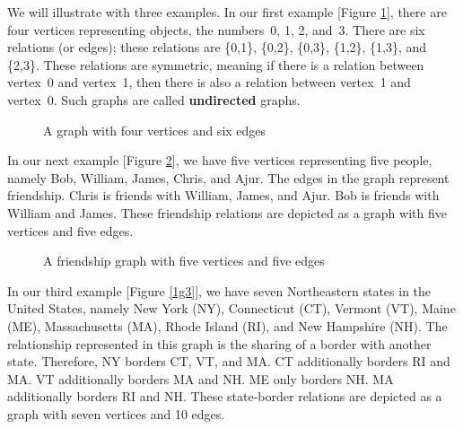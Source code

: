 We will illustrate with three examples. In our first example [Figure \ref{1g1}], there are four vertices representing objects, the numbers~0, 1, 2, and~3. There are six relations (or edges); these relations are \{0,1\}, \{0,2\}, \{0,3\}, \{1,2\}, \{1,3\}, and \{2,3\}. These relations are symmetric, meaning if there is a relation between vertex~0 and vertex~1, then there is also a relation between vertex~1 and vertex~0. Such graphs are called \textbf{undirected} graphs.
\begin{figure}
\begin{center}
\caption{A graph with four vertices and six edges}\label{1g1}
\end{center}
\end{figure}
\begin{newpage}
\end{newpage}

In our next example [Figure \ref{1g2}], we have five vertices representing five people, namely Bob, William, James, Chris, and Ajur. The edges in the graph represent friendship. Chris is friends with William, James, and Ajur. Bob is friends with William and James. These friendship relations are depicted as a graph with five vertices and five edges.
\begin{figure}
\begin{center}
\caption{A friendship graph with five vertices and five edges}\label{1g2}
\end{center}
\end{figure}


\begin{newpage}
\end{newpage}
In our third example [Figure \ref{1g3}], we have seven Northeastern states in the United States, namely New York (NY), Connecticut (CT), Vermont (VT), Maine (ME), Massachusetts (MA), Rhode Island (RI), and New Hampshire (NH). The relationship represented in this graph is the sharing of a border with another state. Therefore, NY borders CT, VT, and MA. CT additionally borders RI and MA. VT additionally borders MA and NH. ME only borders NH. MA additionally borders RI and NH. These state-border relations are depicted as a graph with seven vertices and 10 edges.

